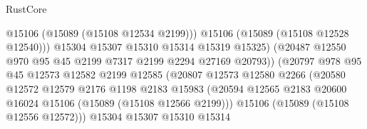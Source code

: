 \begin{lexlean}{RustCore}
\begin{coremodule}
                                            @15106
                                            (@15089 (@15108 @12534 @2199)))
                                          @15106
                                          (@15089 (@15108 @12528 @12540)))
                                        @15304
                                        @15307
                                        @15310
                                        @15314
                                        @15319
                                        @15325)
                                      (@20487
                                        @12550
                                        @970
                                        @95
                                        @45
                                        @2199
                                        @7317
                                        @2199
                                        @2294
                                        @27169
                                        @20793))
                                    (@20797
                                      @978
                                      @95
                                      @45
                                      @12573
                                      @12582
                                      @2199
                                      @12585
                                      (@20807
                                        @12573
                                        @12580
                                        @2266
                                        (@20580
                                          @12572
                                          @12579
                                          @2176
                                          @1198
                                          @2183
                                          @15983
                                          (@20594
                                            @12565
                                            @2183
                                            @20600
                                            @16024
                                            @15106
                                            (@15089 (@15108 @12566 @2199)))
                                          @15106
                                          (@15089 (@15108 @12556 @12572)))
                                        @15304
                                        @15307
                                        @15310
                                        @15314

\end{coremodule}
\end{lexlean}
